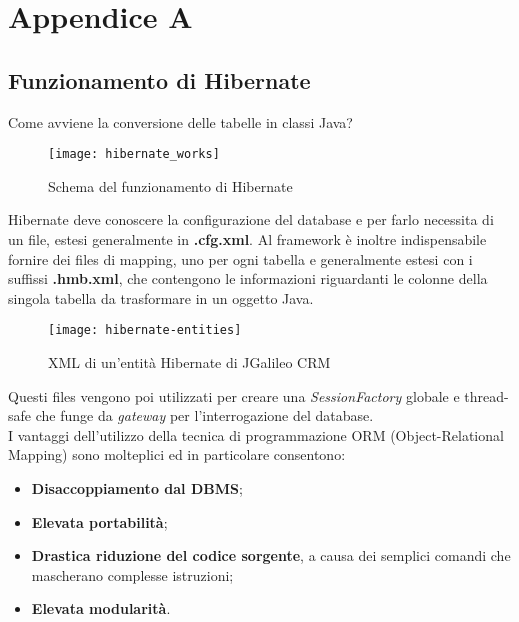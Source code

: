 
\chapter{Appendice A}

\section{Funzionamento di Hibernate} 
\label{sec:appendice-1}
Come avviene la conversione delle tabelle in classi Java?\\
\begin{figure}[h]
	\centering
	\texttt{[image: hibernate\_works]}
	\caption{Schema del funzionamento di Hibernate}
	\label{schema-generale-hibernate}
\end{figure}
Hibernate deve conoscere la configurazione del database e per farlo necessita di un file, estesi generalmente in \textbf{.cfg.xml}. Al framework è inoltre indispensabile fornire dei files di mapping, uno per ogni tabella e generalmente estesi con i suffissi \textbf{.hmb.xml}, che contengono le informazioni riguardanti le colonne della singola tabella da trasformare in un oggetto Java.\\

\begin{figure}[h]
	\centering
	\texttt{[image: hibernate-entities]}
	\caption{XML di un'entità Hibernate di JGalileo CRM}
	\label{entità}
\end{figure}

Questi files vengono poi utilizzati per creare una \emph{SessionFactory} globale e thread-safe che funge da \emph{gateway} per l'interrogazione del database. \\ I vantaggi dell'utilizzo della tecnica di programmazione ORM (Object-Relational Mapping) sono molteplici ed in particolare consentono:
\begin{itemize}
	\item \textbf{Disaccoppiamento dal DBMS};
	\item \textbf{Elevata portabilità};
	\item \textbf{Drastica riduzione del codice sorgente}, a causa dei semplici comandi che mascherano complesse istruzioni;
	\item \textbf{Elevata modularità}.
\end{itemize}

